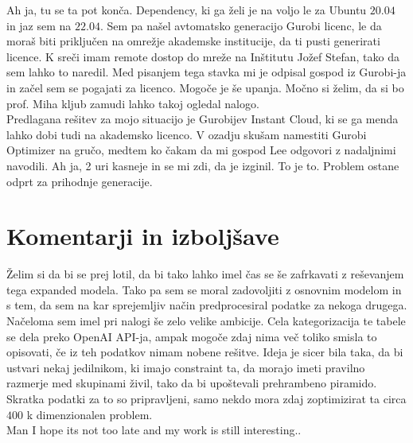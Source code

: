 \documentclass[a4paper]{article}
\begin{document}
Ah ja, tu se ta pot konča. Dependency, ki ga želi je na voljo le za Ubuntu $20.04$ in jaz sem na $22.04$. Sem pa našel 
avtomatsko generacijo Gurobi licenc, le da moraš biti priključen na omrežje akademske institucije, da ti pusti generirati
licence. K sreči imam remote dostop do mreže na Inštitutu Jožef Stefan, tako da sem lahko to naredil. Med pisanjem tega stavka
mi je odpisal gospod iz Gurobi-ja in začel sem se pogajati za licenco. Mogoče je še upanja. Močno si želim, da si bo prof. Miha
kljub zamudi lahko takoj ogledal nalogo. \\

Predlagana rešitev za mojo situacijo je Gurobijev Instant Cloud, ki se ga menda lahko dobi tudi na akademsko licenco. V ozadju skušam
namestiti Gurobi Optimizer na gručo, medtem ko čakam da mi gospod Lee odgovori z nadaljnimi navodili. Ah ja, 2 uri kasneje in se mi zdi, 
da je izginil. To je to. Problem ostane odprt za prihodnje generacije. \\

\section{Komentarji in izboljšave}
Želim si da bi se prej lotil, da bi tako lahko imel čas se še zafrkavati z reševanjem tega expanded modela. Tako pa sem se moral zadovoljiti
z osnovnim modelom in s tem, da sem na kar sprejemljiv način predprocesiral podatke za nekoga drugega. Načeloma sem imel pri nalogi še zelo 
velike ambicije. Cela kategorizacija te tabele se dela preko OpenAI API-ja, ampak mogoče zdaj nima več toliko smisla to opisovati, če iz 
teh podatkov nimam nobene rešitve. Ideja je sicer bila taka, da bi ustvari nekaj jedilnikom, ki imajo constraint ta, da morajo imeti pravilno
razmerje med skupinami živil, tako da bi upoštevali prehrambeno piramido. Skratka podatki za to so pripravljeni, samo nekdo mora zdaj zoptimizirat
ta circa $400$ k dimenzionalen problem. \\

Man I hope its not too late and my work is still interesting.. \\

\newpage


\end{document}
